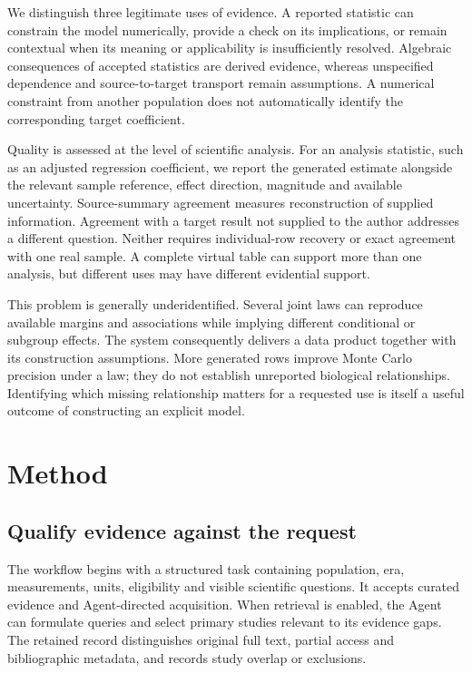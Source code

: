 \documentclass[10pt,twocolumn]{article}
\begin{document}
We distinguish three legitimate uses of evidence. A reported statistic can constrain the model numerically, provide a check on its implications, or remain contextual when its meaning or applicability is insufficiently resolved. Algebraic consequences of accepted statistics are derived evidence, whereas unspecified dependence and source-to-target transport remain assumptions. A numerical constraint from another population does not automatically identify the corresponding target coefficient.


Quality is assessed at the level of scientific analysis. For an analysis statistic, such as an adjusted regression coefficient, we report the generated estimate alongside the relevant sample reference, effect direction, magnitude and available uncertainty. Source-summary agreement measures reconstruction of supplied information. Agreement with a target result not supplied to the author addresses a different question. Neither requires individual-row recovery or exact agreement with one real sample. A complete virtual table can support more than one analysis, but different uses may have different evidential support.


This problem is generally underidentified. Several joint laws can reproduce available margins and associations while implying different conditional or subgroup effects. The system consequently delivers a data product together with its construction assumptions. More generated rows improve Monte Carlo precision under a law; they do not establish unreported biological relationships. Identifying which missing relationship matters for a requested use is itself a useful outcome of constructing an explicit model.


\section{Method}

\subsection{Qualify evidence against the request}

The workflow begins with a structured task containing population, era, measurements, units, eligibility and visible scientific questions. It accepts curated evidence and Agent-directed acquisition. When retrieval is enabled, the Agent can formulate queries and select primary studies relevant to its evidence gaps. The retained record distinguishes original full text, partial access and bibliographic metadata, and records study overlap or exclusions.
\end{document}
